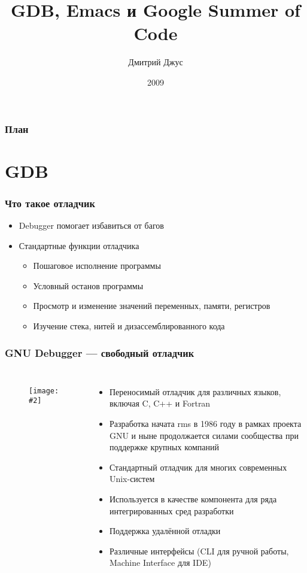 \documentclass[onlymath]{beamer}
\title{GDB, Emacs и Google Summer of Code }
\author{Дмитрий Джус}
\institute{МГТУ им. Н.Э.Баумана}
\date{2009}
\newcommand{\cenfig}[2]{\begin{figure}\centering\texttt{[image: \#2]}
  \end{figure}}
\begin{document}
\begin{frame}
  \titlepage
\end{frame}

\begin{frame}
  \frametitle{План}
  \tableofcontents
\end{frame}

\section{GDB}

\begin{frame}
  \frametitle{Что такое отладчик}
  \begin{itemize}
  \item Debugger помогает избавиться от багов
  \item Стандартные функции отладчика
    \begin{itemize}
    \item Пошаговое исполнение программы
    \item Условный останов программы
    \item Просмотр и изменение значений переменных, памяти,
      регистров
    \item Изучение стека, нитей и дизассемблированного кода
    \end{itemize}
  \end{itemize}
\end{frame}

\begin{frame}
  \frametitle{GNU Debugger — свободный отладчик}
  \begin{columns}
    \cenfig{0.5}{archer.jpg}

  \begin{itemize}
  \item Переносимый отладчик для различных языков, включая C, C++ и Fortran
  \item Разработка начата rms в 1986 году в рамках проекта GNU и ныне
    продолжается силами сообщества при поддержке крупных компаний
  \item Стандартный отладчик для многих современных Unix-систем
  \item Используется в качестве компонента для ряда интегрированных
    сред разработки
  \item Поддержка удалённой отладки
  \item Различные интерфейсы (CLI для ручной работы, Machine Interface
    для IDE)
  \end{itemize}
\end{columns}
\end{frame}
\end{document}
